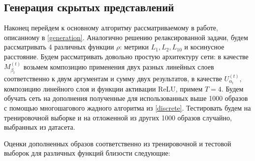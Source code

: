 \documentclass[a4paper,14pt]{extarticle}
\begin{document}
			\subsection{Генерация скрытых представлений}
				Наконец перейдем к основному алгоритму рассматриваемому в работе, описанному в \ref{generation}. Аналогично решению релаксированной задачи, будем рассматривать 4 различных функции $\rho$: метрики $L_1, L_2, L_{10}$ и косинусное расстояние. Будем рассматривать довольно простую архитектуру сети: в качестве $M^{(t)}_{\beta_t}$ возьмем композицию применения двух разных линейных слоев соответственно к двум аргументам и сумму двух результатов, в качестве $U^{(t)}_{\alpha_t},$ композицию линейного слоя и функции активации ReLU, примем $T=4$. Будем обучать сеть на дополнения полученные для использованных выше 1000 образов с помощью многошагового жадного алгоритма из \ref{discrete}. Тестировать будем на тренировочной выборке и на отложенной из других 1000 образов случайно, выбранных из датасета.
				
				Оценки дополненных образов соответственно из тренировочной и тестовой выборок для различных функций близости следующие:
				
\end{document}

